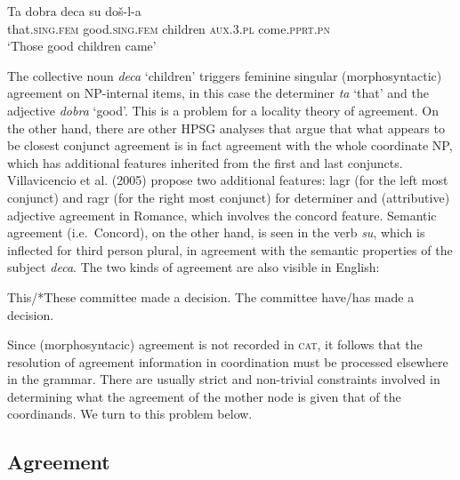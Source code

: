\documentclass[output=paper]{langsci/langscibook}
\begin{document}
\begin{exe}
\ex \gll Ta dobra deca su do\v{s}-l-a\\
         that.\textsc{sing.fem} good.\textsc{sing.fem} children \textsc{aux}.\textsc{3.pl} come.\textsc{pprt.pn}\\
  \glt `Those good children came'   \\
  \citep[51]{wechsler} 
\end{exe}

\noindent
The collective noun \emph{deca} `children' triggers feminine singular (morphosyntactic) agreement on NP-internal items, in this case the determiner {\it ta} `that' and the adjective \emph{dobra} `good'.   This is a problem for a locality theory of agreement. On the other hand, there are other HPSG analyses that argue that what appears to be closest conjunct agreement is in fact agreement with the whole coordinate NP, which has additional features inherited from the first and last conjuncts. Villavicencio et al. (2005) propose two additional features: {\sc lagr} (for the left most conjunct) and {\sc ragr} (for the right most conjunct) for determiner and (attributive) adjective agreement in Romance, which involves the {\sc concord} feature.
Semantic agreement (i.e.\ Concord), on the other hand, is seen in the verb \emph{su}, which  is inflected for third person plural, in agreement with the semantic properties of the subject \emph{deca}. The two kinds of agreement are also visible in
English:

\begin{exe}
\ex
\begin{xlista}
\ex This/*These committee made a decision.
\ex The committee have/has made a decision.
\end{xlista}
\end{exe}


\noindent
Since (morphosyntacic) agreement is not recorded in \textsc{cat}, it follows that the resolution of agreement information in coordination must be processed elsewhere in the grammar. There are usually strict and non-trivial constraints involved in determining what the agreement of the mother node is given that of the coordinands. We turn to this problem below.







\subsection{Agreement}
\end{document}
